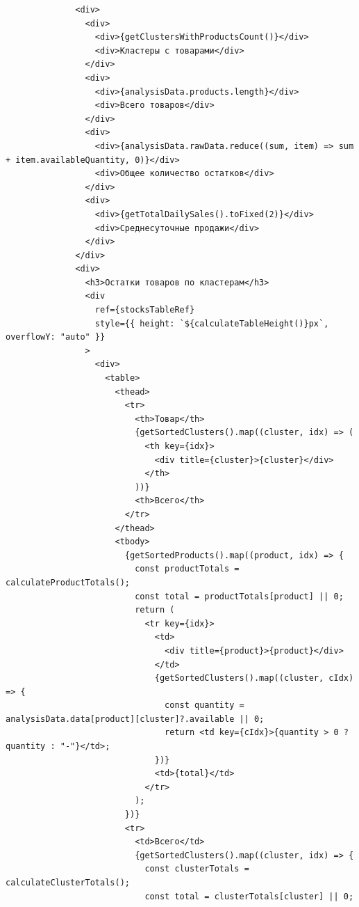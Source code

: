 \begin{code}
\begin{verbatim}
              <div>
                <div>
                  <div>{getClustersWithProductsCount()}</div>
                  <div>Кластеры с товарами</div>
                </div>
                <div>
                  <div>{analysisData.products.length}</div>
                  <div>Всего товаров</div>
                </div>
                <div>
                  <div>{analysisData.rawData.reduce((sum, item) => sum + item.availableQuantity, 0)}</div>
                  <div>Общее количество остатков</div>
                </div>
                <div>
                  <div>{getTotalDailySales().toFixed(2)}</div>
                  <div>Среднесуточные продажи</div>
                </div>
              </div>
              <div>
                <h3>Остатки товаров по кластерам</h3>
                <div
                  ref={stocksTableRef}
                  style={{ height: `${calculateTableHeight()}px`, overflowY: "auto" }}
                >
                  <div>
                    <table>
                      <thead>
                        <tr>
                          <th>Товар</th>
                          {getSortedClusters().map((cluster, idx) => (
                            <th key={idx}>
                              <div title={cluster}>{cluster}</div>
                            </th>
                          ))}
                          <th>Всего</th>
                        </tr>
                      </thead>
                      <tbody>
                        {getSortedProducts().map((product, idx) => {
                          const productTotals = calculateProductTotals();
                          const total = productTotals[product] || 0;
                          return (
                            <tr key={idx}>
                              <td>
                                <div title={product}>{product}</div>
                              </td>
                              {getSortedClusters().map((cluster, cIdx) => {
                                const quantity = analysisData.data[product][cluster]?.available || 0;
                                return <td key={cIdx}>{quantity > 0 ? quantity : "-"}</td>;
                              })}
                              <td>{total}</td>
                            </tr>
                          );
                        })}
                        <tr>
                          <td>Всего</td>
                          {getSortedClusters().map((cluster, idx) => {
                            const clusterTotals = calculateClusterTotals();
                            const total = clusterTotals[cluster] || 0;

\end{verbatim}
\end{code}
